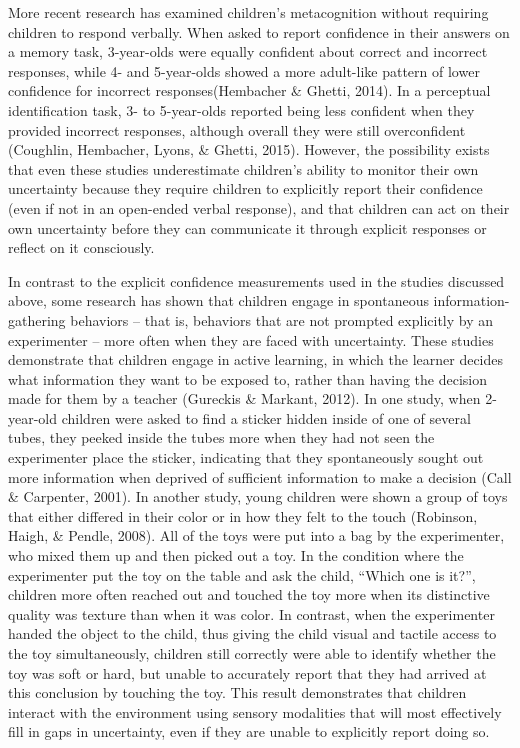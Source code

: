 \documentclass[floatsintext,man]{apa6}
\theoremstyle{definition}
\theoremstyle{definition}
\theoremstyle{definition}
\theoremstyle{remark}
\begin{document}
More recent research has examined children's metacognition without
requiring children to respond verbally. When asked to report confidence
in their answers on a memory task, 3-year-olds were equally confident
about correct and incorrect responses, while 4- and 5-year-olds showed a
more adult-like pattern of lower confidence for incorrect
responses(Hembacher \& Ghetti, 2014). In a perceptual identification
task, 3- to 5-year-olds reported being less confident when they provided
incorrect responses, although overall they were still overconfident
(Coughlin, Hembacher, Lyons, \& Ghetti, 2015). However, the possibility
exists that even these studies underestimate children's ability to
monitor their own uncertainty because they require children to
explicitly report their confidence (even if not in an open-ended verbal
response), and that children can act on their own uncertainty before
they can communicate it through explicit responses or reflect on it
consciously.

In contrast to the explicit confidence measurements used in the studies
discussed above, some research has shown that children engage in
spontaneous information-gathering behaviors -- that is, behaviors that
are not prompted explicitly by an experimenter -- more often when they
are faced with uncertainty. These studies demonstrate that children
engage in active learning, in which the learner decides what information
they want to be exposed to, rather than having the decision made for
them by a teacher (Gureckis \& Markant, 2012). In one study, when
2-year-old children were asked to find a sticker hidden inside of one of
several tubes, they peeked inside the tubes more when they had not seen
the experimenter place the sticker, indicating that they spontaneously
sought out more information when deprived of sufficient information to
make a decision (Call \& Carpenter, 2001). In another study, young
children were shown a group of toys that either differed in their color
or in how they felt to the touch (Robinson, Haigh, \& Pendle, 2008). All
of the toys were put into a bag by the experimenter, who mixed them up
and then picked out a toy. In the condition where the experimenter put
the toy on the table and ask the child, \enquote{Which one is it?},
children more often reached out and touched the toy more when its
distinctive quality was texture than when it was color. In contrast,
when the experimenter handed the object to the child, thus giving the
child visual and tactile access to the toy simultaneously, children
still correctly were able to identify whether the toy was soft or hard,
but unable to accurately report that they had arrived at this conclusion
by touching the toy. This result demonstrates that children interact
with the environment using sensory modalities that will most effectively
fill in gaps in uncertainty, even if they are unable to explicitly
report doing so.
\end{document}
